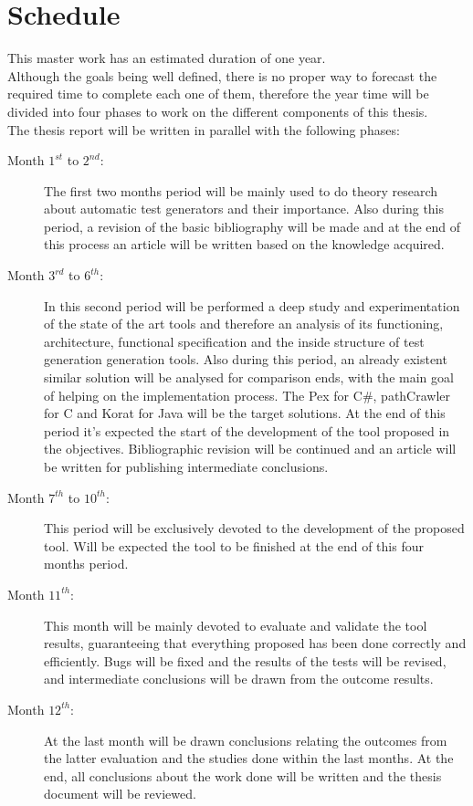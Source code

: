 \documentclass[a4paper,12pt]{article}
\begin{document}
\section{\Large Schedule}
This master work has an estimated duration of one year.\\[6pt]
Although the goals being well defined, there is no proper way to forecast the required time to complete each one of them,
therefore the year time will be divided into four phases to work on the different components of this thesis.\\[6pt]
The thesis report will be written in parallel with the following phases:
\begin{description}
\item[Month $1^{st}$ to $2^{nd}$:] The first two months period will be mainly used to do theory research about
automatic test generators and their importance.
Also during this period, a revision of the basic bibliography will be made and at the end of this process an article will be written based on the knowledge acquired.
\item[Month $3^{rd}$ to $6^{th}$:] In this second period will be performed a deep study and experimentation
of the state of the art tools and therefore an analysis of its functioning, architecture, functional specification and the inside structure
of test generation generation tools.
Also during this period, an already existent similar solution will be analysed for comparison ends, with the main goal of helping on the implementation process.
The Pex\cite{Tillmann:2008:PWB:1792786.1792798} for C\#, pathCrawler\cite{Williams05pathcrawler:automatic} for C and Korat\cite{Boyapati02korat:automated}
for Java will be the target solutions.
At the end of this period it's expected the start of the development of the tool proposed in the objectives.
Bibliographic revision will be continued and an article will be written for publishing intermediate conclusions.
\item[Month $7^{th}$ to $10^{th}$:] This period will be exclusively devoted to the development of the proposed tool.
Will be expected the tool to be finished at the end of this four months period.
\item[Month $11^{th}$:] This month will be mainly devoted to evaluate and validate the tool results, guaranteeing that everything proposed has
been done correctly and efficiently. Bugs will be fixed and the results of the tests will be revised, and intermediate conclusions will be drawn from the outcome results.
\item[Month $12^{th}$:] At the last month will be drawn conclusions relating the outcomes from the latter evaluation and the studies done within
the last months. At the end, all conclusions about the work done will be written and the thesis document will be reviewed.
\end{description}



\end{document}
